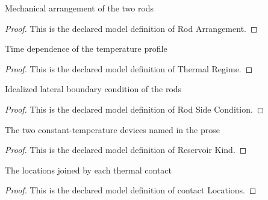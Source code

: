 \begin{definition}
  \label{def:physics:phyx-mini-0488:phyxminiproblems-problemphyxmini0488-rodarrangement}
  Mechanical arrangement of the two rods
\end{definition}
\begin{proof}
  This is the declared model definition of Rod Arrangement.
\end{proof}
\begin{definition}
  \label{def:physics:phyx-mini-0488:phyxminiproblems-problemphyxmini0488-thermalregime}
  Time dependence of the temperature profile
\end{definition}
\begin{proof}
  This is the declared model definition of Thermal Regime.
\end{proof}
\begin{definition}
  \label{def:physics:phyx-mini-0488:phyxminiproblems-problemphyxmini0488-rodsidecondition}
  Idealized lateral boundary condition of the rods
\end{definition}
\begin{proof}
  This is the declared model definition of Rod Side Condition.
\end{proof}
\begin{definition}
  \label{def:physics:phyx-mini-0488:phyxminiproblems-problemphyxmini0488-reservoirkind}
  The two constant-temperature devices named in the prose
\end{definition}
\begin{proof}
  This is the declared model definition of Reservoir Kind.
\end{proof}
\begin{definition}
  \label{def:physics:phyx-mini-0488:phyxminiproblems-problemphyxmini0488-contactlocations}
  The locations joined by each thermal contact
\end{definition}
\begin{proof}
  This is the declared model definition of contact Locations.
\end{proof}
